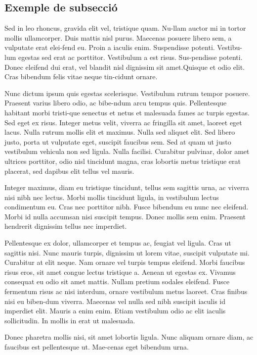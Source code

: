 ﻿\documentclass[10pt,a4paper,twocolumn,twoside]{article}
\begin{document}
\subsection{Exemple de subsecció}


Sed in leo rhoncus, gravida elit vel, tristique quam. Nu-llam auctor mi in tortor mollis ullamcorper. Duis mattis nisl purus. Maecenas posuere libero sem, a vulputate erat elei-fend eu. Proin a iaculis enim. Suspendisse potenti. Vestibu-lum egestas sed erat ac porttitor. Vestibulum a est risus. Sus-pendisse potenti. Donec eleifend dui erat, vel blandit nisl dignissim sit amet.Quisque et odio elit. Cras bibendum felis vitae neque tin-cidunt ornare. 

Nunc dictum ipsum quis egestas scelerisque. Vestibulum rutrum tempor posuere. Praesent varius libero odio, ac bibe-ndum arcu tempus quis. Pellentesque habitant morbi tristi-que senectus et netus et malesuada fames ac turpis egestas. Sed eget ex risus. Integer metus velit, viverra ac fringilla sit amet, laoreet eget lacus. Nulla rutrum mollis elit et maximus. Nulla sed aliquet elit. Sed libero justo, porta ut vulputate eget, suscipit faucibus sem. Sed at quam ut justo vestibulum vehicula non sed ligula. Nulla facilisi. Curabitur pulvinar, dolor amet ultrices porttitor, odio nisl tincidunt magna, cras lobortis metus tristique erat placerat, sed dapibus elit tellus vel mauris.

Integer maximus, diam eu tristique tincidunt, tellus sem sagittis urna, ac viverra nisi nibh nec lectus. Morbi mollis tincidunt ligula, in vestibulum lectus condimentum eu. Cras nec porttitor nibh. Fusce bibendum eu nunc nec eleifend. Morbi id nulla accumsan nisi suscipit tempus. Donec mollis sem enim. Praesent hendrerit dignissim tellus nec imperdiet. 

Pellentesque ex dolor, ullamcorper et tempus ac, feugiat vel ligula. Cras ut sagittis nisi. Nunc mauris turpis, dignissim ut lorem vitae, suscipit vulputate mi. Curabitur at elit neque. Nam ornare vel turpis tempus eleifend. Morbi faucibus risus eros, sit amet congue lectus tristique a. Aenean ut egestas ex. Vivamus consequat eu odio sit amet mattis. Nullam pretium sodales eleifend. Fusce fermentum risus ac nisi interdum, ornare vestibulum metus laoreet. Cras finibus nisi eu biben-dum viverra. Maecenas vel nulla sed nibh suscipit iaculis id imperdiet elit. Mauris a enim enim. Etiam vestibulum odio ac elit iaculis sollicitudin. In mollis in erat ut malesuada. 

Donec pharetra mollis nisi, sit amet lobortis ligula. Nunc aliquam ornare diam, ac faucibus est pellentesque ut. Mae-cenas eget bibendum urna. 
\end{document}

